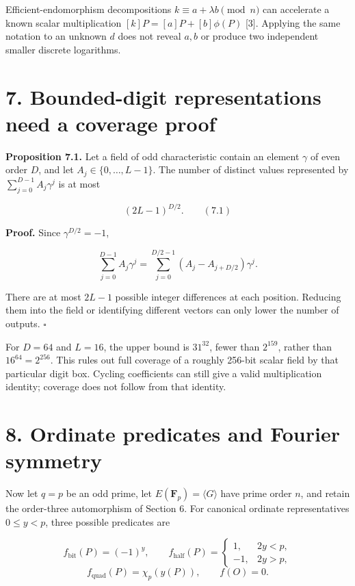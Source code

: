 \documentclass[
  11pt,
  a4paper,
]{article}
\begin{document}
Efficient-endomorphism decompositions \(k\equiv a+\lambda b\pmod n\) can
accelerate a known scalar multiplication \([k]P=[a]P+[b]\phi(P)\)
{[}3{]}. Applying the same notation to an unknown \(d\) does not reveal
\(a,b\) or produce two independent smaller discrete logarithms.

\section{7. Bounded-digit representations need a coverage
proof}\label{bounded-digit-representations-need-a-coverage-proof}

\textbf{Proposition 7.1.} Let a field of odd characteristic contain an
element \(\gamma\) of even order \(D\), and let
\(A_j\in\{0,\ldots,L-1\}\). The number of distinct values represented by
\(\sum_{j=0}^{D-1}A_j\gamma^j\) is at most

\[
(2L-1)^{D/2}. \qquad (7.1)
\]

\textbf{Proof.} Since \(\gamma^{D/2}=-1\),

\[
\sum_{j=0}^{D-1}A_j\gamma^j
=\sum_{j=0}^{D/2-1}(A_j-A_{j+D/2})\gamma^j.
\]

There are at most \(2L-1\) possible integer differences at each
position. Reducing them into the field or identifying different vectors
can only lower the number of outputs. \(\square\)

For \(D=64\) and \(L=16\), the upper bound is \(31^{32}\), fewer than
\(2^{159}\), rather than \(16^{64}=2^{256}\). This rules out full
coverage of a roughly 256-bit scalar field by that particular digit box.
Cycling coefficients can still give a valid multiplication identity;
coverage does not follow from that identity.

\section{8. Ordinate predicates and Fourier
symmetry}\label{ordinate-predicates-and-fourier-symmetry}

Now let \(q=p\) be an odd prime, let \(E(\mathbf F_p)=\langle G\rangle\)
have prime order \(n\), and retain the order-three automorphism of
Section 6. For canonical ordinate representatives \(0\leq y<p\), three
possible predicates are

\[
f_{\mathrm{bit}}(P)=(-1)^y,\qquad
f_{\mathrm{half}}(P)=\begin{cases}1,&2y<p,\\-1,&2y>p,\end{cases}
\] \[
f_{\mathrm{quad}}(P)=\chi_p(y(P)),\qquad f(O)=0.
\]
\end{document}
